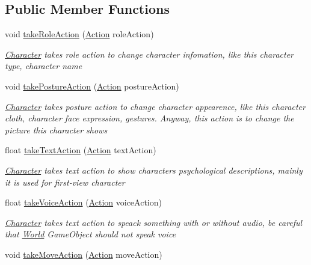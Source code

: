 \subsection*{Public Member Functions}
\begin{DoxyCompactItemize}
\item 
void \hyperlink{class_character_a573341815bfa78669477195374daadf1}{take\+Role\+Action} (\hyperlink{classdoki_script_setting_1_1_action}{Action} role\+Action)
\begin{DoxyCompactList}\small\item\em \hyperlink{class_character}{Character} takes role action to change character infomation, like this character type, character name \end{DoxyCompactList}\item 
void \hyperlink{class_character_a69ac951b0d4ae081906647d9f1aed69b}{take\+Posture\+Action} (\hyperlink{classdoki_script_setting_1_1_action}{Action} posture\+Action)
\begin{DoxyCompactList}\small\item\em \hyperlink{class_character}{Character} takes posture action to change character appearence, like this character cloth, character face expression, gestures. Anyway, this action is to change the picture this character shows \end{DoxyCompactList}\item 
float \hyperlink{class_character_aecab3ff77e1465b64ab5fbf17b5b5401}{take\+Text\+Action} (\hyperlink{classdoki_script_setting_1_1_action}{Action} text\+Action)
\begin{DoxyCompactList}\small\item\em \hyperlink{class_character}{Character} takes text action to show character\textquotesingle{}s psychological descriptions, mainly it is used for first-\/view character \end{DoxyCompactList}\item 
float \hyperlink{class_character_a5889e5d24f7f965fed30c9ed4e16d747}{take\+Voice\+Action} (\hyperlink{classdoki_script_setting_1_1_action}{Action} voice\+Action)
\begin{DoxyCompactList}\small\item\em \hyperlink{class_character}{Character} takes text action to speack something with or without audio, be careful that \hyperlink{class_world}{World} Game\+Object should not speak voice \end{DoxyCompactList}\item 
void \hyperlink{class_character_a29dfe4685fcb35c7d7bd76cca05f54b7}{take\+Move\+Action} (\hyperlink{classdoki_script_setting_1_1_action}{Action} move\+Action)

\end{DoxyCompactItemize}

